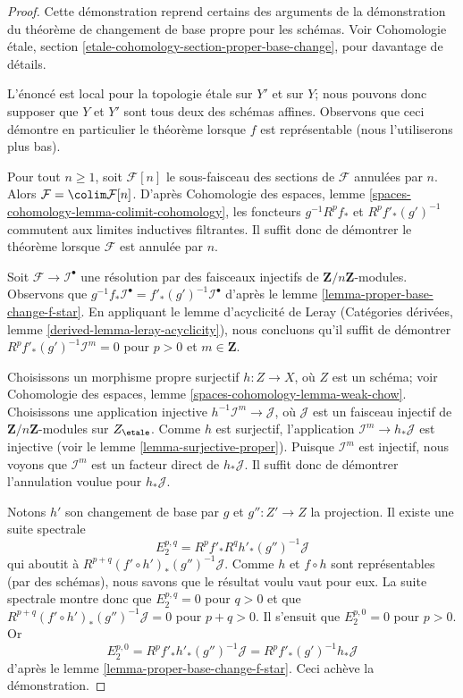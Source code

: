 \begin{proof}
Cette démonstration reprend certains des arguments de la démonstration du
théorème de changement de base propre pour les schémas. Voir
Cohomologie étale, section \ref{etale-cohomology-section-proper-base-change},
pour davantage de détails.

\medskip\noindent
L'énoncé est local pour la topologie étale sur $Y'$ et sur $Y$; nous pouvons
donc supposer que $Y$ et $Y'$ sont tous deux des schémas affines. Observons que
ceci démontre en particulier le théorème lorsque $f$ est représentable
(nous l'utiliserons plus bas).

\medskip\noindent
Pour tout $n \geq 1$, soit $\mathcal{F}[n]$ le sous-faisceau des sections
de $\mathcal{F}$ annulées par $n$. Alors
$\mathcal{F} = \colim \mathcal{F}[n]$. D'après 
Cohomologie des espaces, lemme \ref{spaces-cohomology-lemma-colimit-cohomology},
les foncteurs $g^{-1}R^pf_*$ et $R^pf'_*(g')^{-1}$ commutent
aux limites inductives filtrantes. Il suffit donc de démontrer le théorème
lorsque $\mathcal{F}$ est annulée par $n$.

\medskip\noindent
Soit $\mathcal{F} \to \mathcal{I}^\bullet$ une résolution par des
faisceaux injectifs de $\mathbf{Z}/n\mathbf{Z}$-modules.
Observons que
$g^{-1}f_*\mathcal{I}^\bullet = f'_*(g')^{-1}\mathcal{I}^\bullet$
d'après le lemme \ref{lemma-proper-base-change-f-star}.
En appliquant le lemme d'acyclicité de Leray
(Catégories dérivées, lemme \ref{derived-lemma-leray-acyclicity}),
nous concluons qu'il suffit de démontrer
$R^pf'_*(g')^{-1}\mathcal{I}^m = 0$ pour $p > 0$ et $m \in \mathbf{Z}$.

\medskip\noindent
Choisissons un morphisme propre surjectif
$h : Z \to X$, où $Z$ est un schéma; voir
Cohomologie des espaces, lemme \ref{spaces-cohomology-lemma-weak-chow}.
Choisissons une application injective $h^{-1}\mathcal{I}^m \to \mathcal{J}$,
où $\mathcal{J}$ est un faisceau injectif de
$\mathbf{Z}/n\mathbf{Z}$-modules sur $Z_\etale$.
Comme $h$ est surjectif, l'application $\mathcal{I}^m \to h_*\mathcal{J}$
est injective (voir le lemme \ref{lemma-surjective-proper}).
Puisque $\mathcal{I}^m$ est injectif, nous voyons que $\mathcal{I}^m$
est un facteur direct de
$h_*\mathcal{J}$. Il suffit donc de démontrer l'annulation voulue
pour $h_*\mathcal{J}$.

\medskip\noindent
Notons $h'$ son changement de base par $g$ et
$g'' : Z' \to Z$ la projection. Il existe une suite spectrale
$$
E_2^{p, q} = R^pf'_* R^qh'_* (g'')^{-1}\mathcal{J}
$$
qui aboutit à $R^{p + q}(f' \circ h')_*(g'')^{-1}\mathcal{J}$.
Comme $h$ et $f \circ h$ sont représentables (par des schémas),
nous savons que le résultat voulu vaut pour eux. La suite spectrale montre donc
que $E_2^{p, q} = 0$ pour $q > 0$ et que
$R^{p + q}(f' \circ h')_*(g'')^{-1}\mathcal{J} = 0$
pour $p + q > 0$. Il s'ensuit que $E_2^{p, 0} = 0$ pour $p > 0$.
Or
$$
E_2^{p, 0} = R^pf'_* h'_* (g'')^{-1}\mathcal{J} =
R^pf'_* (g')^{-1}h_*\mathcal{J}
$$
d'après le lemme \ref{lemma-proper-base-change-f-star}. Ceci achève la démonstration.
\end{proof}

